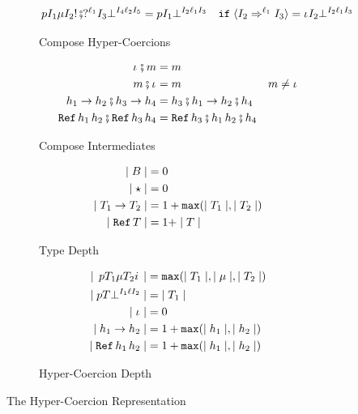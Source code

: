 \documentclass[acmtog, authorversion, acmlarge]{acmart}
\begin{document}
\begin{figure}[tbh]
\begin{subfigure}{.5\textwidth}
\begin{align*}
      \cmp{\hc{\Prj}{\I_1}{\Med}{\I_2}{\inj}} %
          {\hcfail{\prj{\Lbl_1}}{\I_3}{\I_4}{\Lbl_2}{\I_5}} %
      &=  \hcfail{\Prj}{\I_1}{\I_2}{\Lbl_1}{\I_3} %
          & \texttt{if} \;
          \mkcrcn[\Lbl_1]{\I_2}{\I_3} = \hcfail{\pmt}{\I_2}{\I_2}{\Lbl_1}{\I_3}
    \end{align*}
    \caption{Compose Hyper-Coercions}
    \label{fig:composeHC}
  \end{subfigure}%
  \begin{subfigure}{.5\textwidth}
    \begin{align*}
      \cmpm{\id}{m} &= m\\
      \cmpm{m}{\id} &= m & m \neq \id \\
      \cmpm{\fn{\HC_1}{\HC_2}}{\fn{\HC_3}{\HC_4}} %
      &= \fn{\cmp{\HC_3}{\HC_1}}{\cmp{\HC_2}{\HC_4}}\\
      \cmpm{\rf{\HC_1}{\HC_2}}{\rf{\HC_3}{\HC_4}} %
      &= \rf{\cmp{\HC_3}{\HC_1}}{\cmp{\HC_2}{\HC_4}}\\ 
    \end{align*}
    \caption{Compose Intermediates}
    \label{fig:composeMed}
  \end{subfigure}
  \begin{subfigure}{.5\textwidth}
    \begin{align*}
      \mid B \mid &= 0 \\
      \mid \star \mid &= 0 \\
      \mid T_1  \to  T_2 \mid &= 1 + \texttt{max}(\mid T_1 \mid, \mid T_2 \mid)\\
      \mid \texttt{Ref} \, T \mid &= 1 + \mid T \mid
    \end{align*}
    \caption{Type Depth}
    \label{fig:hctydepth}
  \end{subfigure}%
  \begin{subfigure}{.5\textwidth}
    \begin{align*}
      \depth{\hc{\Prj}{\T_1}{\Med}{\T_2}{\Inj}} %
      &= \Max{\depth{\T_1},\depth{\Med},\depth{\T_2}}\\
      \depth{\hcfail{\Prj}{\T}{\I_1}{\Lbl}{\I_2}} %
      &= \; \depth{\T_1} \\
      \depth{\id} &= 0\\
      \depth{\fn{\HC_1}{\HC_2}} &= 1 + \Max{\depth{\HC_1}, \depth{\HC_2}}\\
      \depth{\rf{\HC_1}{\HC_2}} &= 1 + \Max{\depth{\HC_1}, \depth{\HC_2}}
    \end{align*}
    \caption{Hyper-Coercion Depth}
    \label{fig:hctydepth}
    \end{subfigure}
  \caption{The Hyper-Coercion Representation}
  \label{fig:hc}
\end{figure}
\end{document}
